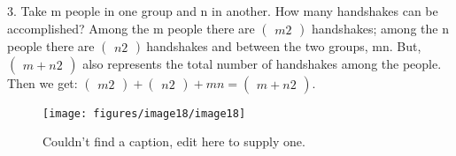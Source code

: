 \documentclass[10pt,letter]{article}
\begin{document}
3. Take m people in one group and n in another. How many handshakes can
be accomplished? Among the m people there are \(\begin{pmatrix}
m
2
\end{pmatrix}
\) handshakes; among the n people there are
\(\begin{pmatrix}
n
2
\end{pmatrix}
\ \)handshakes and between the two groups, mn. But,
\(\begin{pmatrix}
m + n
2
\end{pmatrix}
\) also represents the total number of handshakes among the
people. Then we get: \(\begin{pmatrix}
m
2
\end{pmatrix}
 +
\begin{pmatrix}
n
2
\end{pmatrix}
 + mn =
\begin{pmatrix}
m + n
2
\end{pmatrix}
\).
\begin{figure}[h!]\begin{center}
\texttt{[image: figures/image18/image18]}
\caption{{Couldn't find a caption, edit here to supply one.%
}}
\end{center}
\end{figure}
\end{document}
